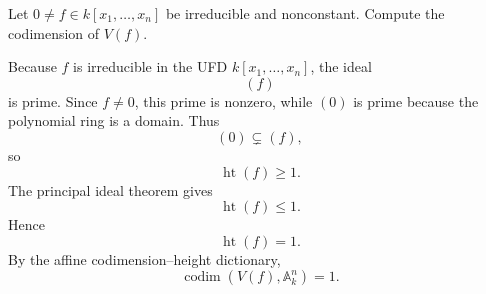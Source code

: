 \begin{problem}\label{prob:vi31-07}
Let \(0\neq f\in k[x_1,\ldots,x_n]\) be irreducible and nonconstant. Compute the codimension of \(V(f)\).
\end{problem}

\ifdefined\FullProblemDossiers
\begin{solution}
Because \(f\) is irreducible in the UFD \(k[x_1,\ldots,x_n]\), the ideal
\[
(f)
\]
is prime. Since \(f\ne0\), this prime is nonzero, while \((0)\) is prime because the polynomial ring is a domain.
Thus
\[
(0)\subsetneq(f),
\]
so
\[
\operatorname{ht}(f)\ge1.
\]
The principal ideal theorem gives
\[
\operatorname{ht}(f)\le1.
\]
Hence
\[
\operatorname{ht}(f)=1.
\]
By the affine codimension--height dictionary,
\[
\boxed{\operatorname{codim}(V(f),\mathbb A^n_k)=1}.
\]
\end{solution}
\fi
